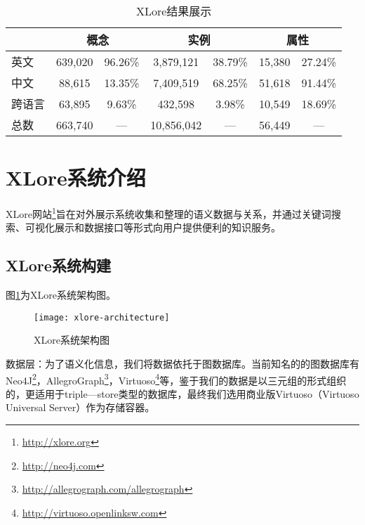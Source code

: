 \begin{table}[htb]
  \centering
  \caption{XLore结果展示}
  \label{tab:xlore-result}
    \begin{tabular}{lcccccc}
      \toprule[1.5pt]
      \multicolumn{1}{c}{} & \multicolumn{2}{c}{概念}     & \multicolumn{2}{c}{实例}                   & \multicolumn{2}{c}{属性}    \\ \midrule[1pt]
英文            & 639,020 & 96.26\%          & 3,879,121   & 38.79\%                & 15,380  & 27.24\%                \\
中文            & 88,615  & 13.35\%          & 7,409,519   & 68.25\%                & 51,618  & 91.44\%                \\
跨语言          & 63,895  & 9.63\%           & 432,598     & 3.98\%                 & 10,549  & 18.69\%                \\
总数           & 663,740 & {—}               & 10,856,042  & {—}                    & 56,449  & {—} \\
      \bottomrule[1.5pt]
    \end{tabular}
\end{table}

\section{XLore系统介绍}
\label{sec5:system-describe}
XLore网站\footnote{\url{http://xlore.org}}旨在对外展示系统收集和整理的语义数据与关系，并通过关键词搜索、可视化展示和数据接口等形式向用户提供便利的知识服务。

\subsection{XLore系统构建}
图\ref{fig:xlore-architecture}为XLore系统架构图。

\begin{figure}[ht]
  \centering
  \texttt{[image: xlore-architecture]}
  \caption{XLore系统架构图}
  \label{fig:xlore-architecture}
\end{figure}

{\heiti 数据层：}为了语义化信息，我们将数据依托于图数据库。当前知名的的图数据库有Neo4J\footnote{\url{http://neo4j.com}}，AllegroGraph\footnote{\url{http://allegrograph.com/allegrograph}}，Virtuoso\footnote{\url{http://virtuoso.openlinksw.com}}等，鉴于我们的数据是以三元组的形式组织的，更适用于triple—store类型的数据库，最终我们选用商业版Virtuoso（Virtuoso Universal Server）作为存储容器。

